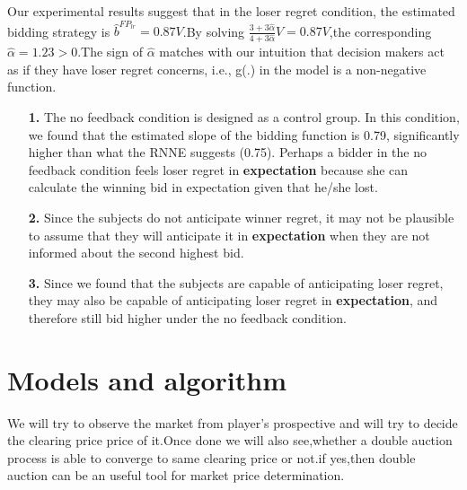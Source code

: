 \documentclass[10pt,a4paper,oneside]{report}
\begin{document}
\noindent Our experimental results suggest that in the loser regret condition, the estimated bidding strategy is $\hat{b}^{{FP}_{lr}}=0.87V$.By solving $\frac{3+3{\hat{\alpha}}}{4+3{\hat{\alpha}}}{V}=0.87V$,the corresponding $\hat{\alpha}=1.23>0$.The sign of $\hat{\alpha}$ matches with our intuition that decision makers act as if they have loser regret concerns, i.e., g(.) in the model is a non-negative function\citep{filizy2005auctions}.
\begin{enumerate}
\item[\textbf{1.}] The no feedback condition is designed as a control group. In this condition, we found that the estimated slope of the bidding function is 0.79, significantly higher than what the RNNE suggests (0.75). Perhaps a bidder in the no feedback condition feels loser regret in \textbf{expectation} because she can calculate the winning bid in expectation given that he/she lost.
\item[\textbf{2.}] Since the subjects do not anticipate winner regret, it may not be plausible to assume that they will anticipate it in \textbf{expectation} when they are not informed about the second highest bid.
\item[\textbf{3.}] Since we found that the subjects are capable of anticipating loser regret, they may also be capable of anticipating loser regret in \textbf{expectation}, and therefore still bid higher under the no feedback condition.
\end{enumerate}

\chapter{Models and algorithm}
We will try to observe the market from player's prospective and will try to decide the clearing price price of it.Once done we will also see,whether a double auction process is able to converge to same clearing price or not.if yes,then double auction can be an useful tool for market price determination. 
\end{document}
